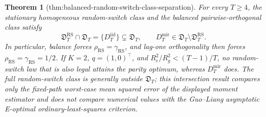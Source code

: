 \documentclass{article}
\newtheorem{theorem}{Theorem}
\begin{document}
\begin{theorem}[thm:balanced-random-switch-class-separation]\label{thm:balanced-random-switch-class-separation}
For every \(T\ge4\), the stationary homogeneous random-switch class and the balanced pairwise-orthogonal class satisfy
\[
\mathfrak D_T^{\mathrm{RS}}\cap\mathfrak D_T=\{D_T^{\mathrm{iid}}\}\subsetneq\mathfrak D_T,
\qquad
D_T^{\mathrm{mir}}\in\mathfrak D_T\setminus\mathfrak D_T^{\mathrm{RS}}.
\]
In particular, balance forces \(\rho_{\mathrm{RS}}=\gamma_{\mathrm{RS}}\), and lag-one orthogonality then forces \(\rho_{\mathrm{RS}}=\gamma_{\mathrm{RS}}=1/2\).  If \(K=2\), \(q=(1,0)^{\top}\), and \(R_e^2/R_g^2<(T-1)/T\), no random-switch law that is also legal attains the parity optimum, whereas \(D_T^{\mathrm{mir}}\) does.  The full random-switch class is generally outside \(\mathfrak D_T\); this intersection result compares only the fixed-path worst-case mean squared error of the displayed moment estimator and does not compare numerical values with the Guo--Liang asymptotic E-optimal ordinary-least-squares criterion.
\end{theorem}
\end{document}
